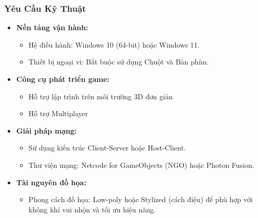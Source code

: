 \begin{frame}
\frametitle{Yêu Cầu Kỹ Thuật}
\begin{itemize}
    \item \textbf{Nền tảng vận hành:}
        \begin{itemize}
            \item Hệ điều hành: Windows 10 (64-bit) hoặc Windows 11.
            \item Thiết bị ngoại vi: Bắt buộc sử dụng Chuột và Bàn phím.
        \end{itemize}
    \item \textbf{Công cụ phát triển game:}
        \begin{itemize}
            \item Hỗ trợ lập trình trên môi trường 3D đơn giản
            \item Hỗ trợ Multiplayer
        \end{itemize}
    \item \textbf{Giải pháp mạng:}
        \begin{itemize}
            \item Sử dụng kiến trúc Client-Server hoặc Host-Client.
            \item Thư viện mạng: Netcode for GameObjects (NGO) hoặc Photon Fusion.
        \end{itemize}
    \item \textbf{Tài nguyên đồ họa:}
        \begin{itemize}
            \item Phong cách đồ họa: Low-poly hoặc Stylized (cách điệu) để phù hợp với không khí vui nhộn và tối ưu hiệu năng.
        \end{itemize}
\end{itemize}
\end{frame}

